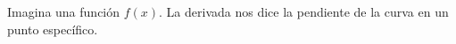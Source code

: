 \documentclass[preview]{standalone}
\begin{document}
\begin{center}
Imagina una función $f(x)$. La derivada nos dice la pendiente de la curva en un punto específico.
\end{center}
\end{document}
